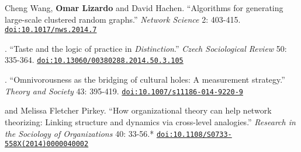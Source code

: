 
\ind Cheng Wang, {\bf Omar Lizardo} and David Hachen. ``Algorithms for generating large-scale clustered random graphs.'' {\em Network Science} 2: 403-415. \href{https://doi.org/10.1017/nws.2014.7}{\nolinkurl{doi:10.1017/nws.2014.7}}

. ``Taste and the logic of practice in {\em Distinction}.'' {\em Czech Sociological Review} 50: 335-364. \href{https://doi.org/10.13060/00380288.2014.50.3.105}{\nolinkurl{doi:10.13060/00380288.2014.50.3.105}}

. ``Omnivorousness as the bridging of cultural holes: A measurement strategy.'' {\em Theory and Society}  43: 395-419. \href{https://doi.org/10.1007/s11186-014-9220-9}{\nolinkurl{doi:10.1007/s11186-014-9220-9}}

 and Melissa Fletcher Pirkey. ``How organizational theory can help network theorizing: Linking structure and dynamics via cross-level analogies.'' {\em Research in the Sociology of Organizations} 40: 33-56.\textcolor{uclablue}{*} \href{https://doi.org/10.1108/S0733-558X(2014)0000040002}{\nolinkurl{doi:10.1108/S0733-558X(2014)0000040002}}